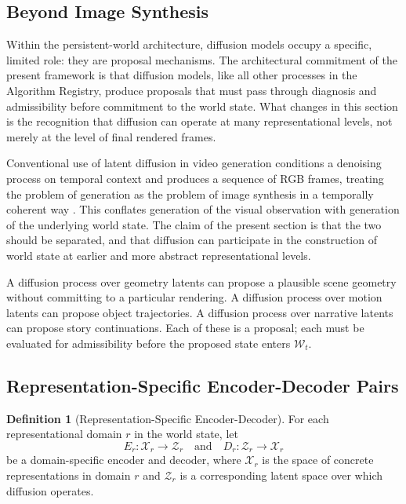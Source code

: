 \documentclass[12pt,a4paper]{article}
\theoremstyle{plain}
\theoremstyle{definition}
\newtheorem{definition}[theorem]{Definition}
\theoremstyle{remark}
\begin{document}
\subsection{Beyond Image Synthesis}

Within the persistent-world architecture, diffusion models \cite{sohl2015,ho2020ddpm,song2021score} occupy a specific, limited role: they are proposal mechanisms. The architectural commitment of the present framework is that diffusion models, like all other processes in the Algorithm Registry, produce proposals that must pass through diagnosis and admissibility before commitment to the world state. What changes in this section is the recognition that diffusion can operate at many representational levels, not merely at the level of final rendered frames.

Conventional use of latent diffusion in video generation conditions a denoising process on temporal context and produces a sequence of RGB frames, treating the problem of generation as the problem of image synthesis in a temporally coherent way \cite{ho2022videodiffusion,rombach2022ldm}. This conflates generation of the visual observation with generation of the underlying world state. The claim of the present section is that the two should be separated, and that diffusion can participate in the construction of world state at earlier and more abstract representational levels.

A diffusion process over geometry latents can propose a plausible scene geometry without committing to a particular rendering. A diffusion process over motion latents can propose object trajectories. A diffusion process over narrative latents can propose story continuations. Each of these is a proposal; each must be evaluated for admissibility before the proposed state enters $\mathcal{W}_t$.

\subsection{Representation-Specific Encoder-Decoder Pairs}

\begin{definition}[Representation-Specific Encoder-Decoder]
For each representational domain $r$ in the world state, let
\[
E_r : \mathcal{X}_r \to \mathcal{Z}_r \quad \text{and} \quad D_r : \mathcal{Z}_r \to \mathcal{X}_r
\]
be a domain-specific encoder and decoder, where $\mathcal{X}_r$ is the space of concrete representations in domain $r$ and $\mathcal{Z}_r$ is a corresponding latent space over which diffusion operates.
\end{definition}
\end{document}
